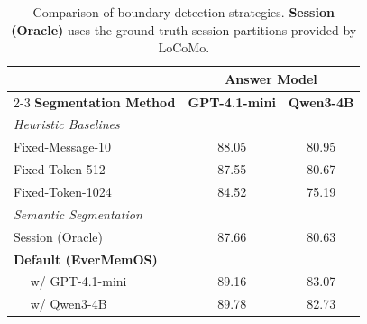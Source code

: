 \begin{table}[!t]
    \centering
    \small
    \renewcommand{\arraystretch}{1.15}
    \setlength{\tabcolsep}{5pt}
    
    \begin{tabular}{l c c}
        \toprule
        & \multicolumn{2}{c}{\textbf{Answer Model}} \\
        \cmidrule(lr){2-3}
        \textbf{Segmentation Method} & \textbf{GPT-4.1-mini} & \textbf{Qwen3-4B} \\
        \midrule
        \multicolumn{3}{l}{\textit{Heuristic Baselines}} \\
        Fixed-Message-10 & 88.05 & 80.95 \\
        Fixed-Token-512 & 87.55 & 80.67 \\
        Fixed-Token-1024 & 84.52 & 75.19 \\
        \midrule
        \multicolumn{3}{l}{\textit{Semantic Segmentation}} \\
        Session (Oracle) & 87.66 & 80.63 \\
        \textbf{Default (EverMemOS)} &  &  \\
        $\quad$ w/ GPT-4.1-mini & 89.16 & 83.07 \\
        $\quad$ w/ Qwen3-4B & 89.78 & 82.73 \\
        \bottomrule
    \end{tabular}
    \vspace{-2mm}
    \caption{
        Comparison of boundary detection strategies.
        \textbf{Session (Oracle)} uses the ground-truth session partitions provided by LoCoMo.
    }
    \vspace{-4mm}
    \label{tab:locomo-bound}
\end{table}
